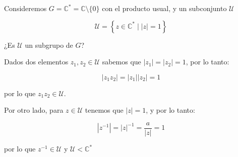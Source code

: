         \begin{ejemplo}
            Consideremos $G = \mathbb{C}^* = \mathbb{C} \setminus \{ 0 \}$ con el producto usual, y un subconjunto $\mathcal{U}$

            \begin{equation*}
                \mathcal{U} = \left\{ z \in \mathbb{C}^* \mid |z| = 1 \right\}
            \end{equation*}

            ¿Es $\mathcal{U}$ un subgrupo de $G$?

            Dados dos elementos $z_1, z_2 \in \mathcal{U}$ sabemos que $|z_1| = |z_2| = 1$, por lo tanto:

            \begin{equation*}
                |z_1 z_2| = |z_1| |z_2| = 1
            \end{equation*}

            por lo que $z_1 z_2 \in \mathcal{U}$.

            Por otro lado, para $z \in \mathcal{U}$ tenemos que $|z| = 1$, y por lo tanto:

            \begin{equation*}
                |z^{-1}| = |z|^{-1} = \frac{a}{|z|} = 1
            \end{equation*}

            por lo que $z^{-1} \in \mathcal{U}$ y $\mathcal{U} < \mathbb{C}^*$
        \end{ejemplo}

